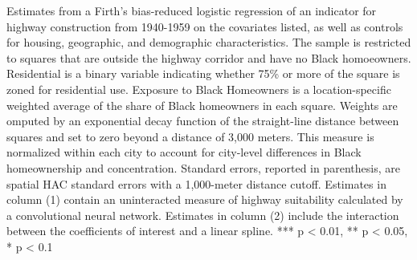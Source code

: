 \begin{table}[h]
\begin{threeparttable}
\begin{tablenotes}[flushleft]
\item Estimates from a Firth's bias-reduced logistic regression of an indicator for highway construction from 1940-1959 on the covariates listed, as well as controls for housing, geographic, and demographic characteristics. The sample is restricted to squares that are outside the highway corridor and have no Black homoeowners. Residential is a binary variable indicating whether 75\% or more of the square is zoned for residential use. Exposure to Black Homeowners is a location-specific weighted average of the share of Black homeowners in each square. Weights are omputed by an exponential decay function of the straight-line distance between squares and set to zero beyond a distance of 3,000 meters. This measure is normalized within each city to account for city-level differences in Black homeownership and concentration. Standard errors, reported in parenthesis, are \textcite{conley_gmm_1999} spatial HAC standard errors with a 1,000-meter distance cutoff. Estimates in column (1) contain an uninteracted measure of highway suitability calculated by a convolutional neural network. Estimates in column (2) include the interaction between the coefficients of interest and a linear spline. *** p < 0.01, ** p < 0.05, * p < 0.1
\end{tablenotes}
\end{threeparttable}
\end{table}
